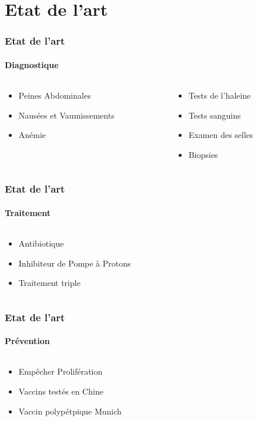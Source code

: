 \documentclass[11pt, notes]{beamer}
\begin{document}
\section{Etat de l'art}
\begin{frame}
\frametitle{Etat de l'art}
\framesubtitle{Diagnostique}
\begin{columns}[c]
	\begin{column}[c]{5cm}
		\begin{itemize}[<+->]
			\item Peines Abdominales
			\item Nausées et Vaumissements
			\item Anémie
		\end{itemize}
	\end{column}
	\begin{column}[c]{5cm}
		\begin{itemize}[<+->]
			\item Tests de l'haleine
			\item Tests sanguins
			\item Examen des selles
			\item Biopsies
		\end{itemize}
	\end{column}
\end{columns}
\end{frame}

\begin{frame}
\frametitle{Etat de l'art}
\framesubtitle{Traitement}
\begin{columns}[c]
	\begin{column}[c]{5cm}
		\begin{itemize}[<+->]
			\item Antibiotique
			\item Inhibiteur de Pompe à Protons
			\item Traitement triple
		\end{itemize}
	\end{column}
	\begin{column}[c]{5cm}
	\end{column}
\end{columns}
\end{frame}

\begin{frame}
\frametitle{Etat de l'art}
\framesubtitle{Prévention}
\begin{columns}[c]
	\begin{column}[c]{5cm}
		\begin{itemize}[<+->]
			\item Empêcher Prolifération
			\item Vaccins testés en Chine
			\item Vaccin polypétpique Munich
		\end{itemize}
	\end{column}
	\begin{column}[c]{5cm}
	\end{column}
\end{columns}
\end{frame}
\end{document}
